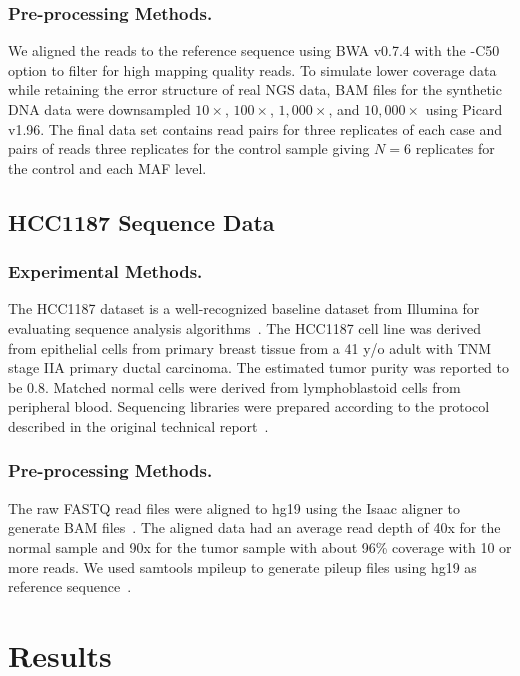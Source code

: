 \documentclass{bioinfo}
\begin{document}
\subsubsection*{Pre-processing Methods.}
 We aligned the reads to the reference sequence using BWA v0.7.4 with the -C50 option to filter for high mapping quality reads. To simulate lower coverage data while retaining the error structure of real NGS data, BAM files for the synthetic DNA data were downsampled $10\times$, $100\times$, $1,000\times$, and $10,000\times$ using Picard v1.96. The final data set contains read pairs for three replicates of each case and pairs of reads three replicates for the control sample giving $N=6$ replicates for the control and each MAF level.

\subsection{HCC1187 Sequence Data}
\subsubsection*{Experimental Methods.}
The HCC1187 dataset is a well-recognized baseline dataset from Illumina for evaluating sequence analysis algorithms~\citep{newman2013relative,howarth2011large,howarth2007array}. The HCC1187 cell line was derived from  epithelial cells from primary breast tissue from a 41 y/o adult with TNM stage IIA primary ductal carcinoma. The estimated tumor purity was reported to be 0.8. Matched normal cells were derived from lymphoblastoid cells from peripheral blood. Sequencing libraries were prepared according to the protocol described in the original technical report~\citep{hcc1187techreport}.
\subsubsection*{Pre-processing Methods.}
 The raw FASTQ read files were aligned to hg19 using the Isaac aligner to generate BAM files~\citep{raczy2013isaac}. The aligned data had an average read depth of 40x for the normal sample and 90x for the tumor sample with about 96\% coverage with 10 or more reads. We used samtools mpileup to generate pileup files using hg19 as reference sequence~\citep{Navin:2010gu}.


\section{Results}
\end{document}
